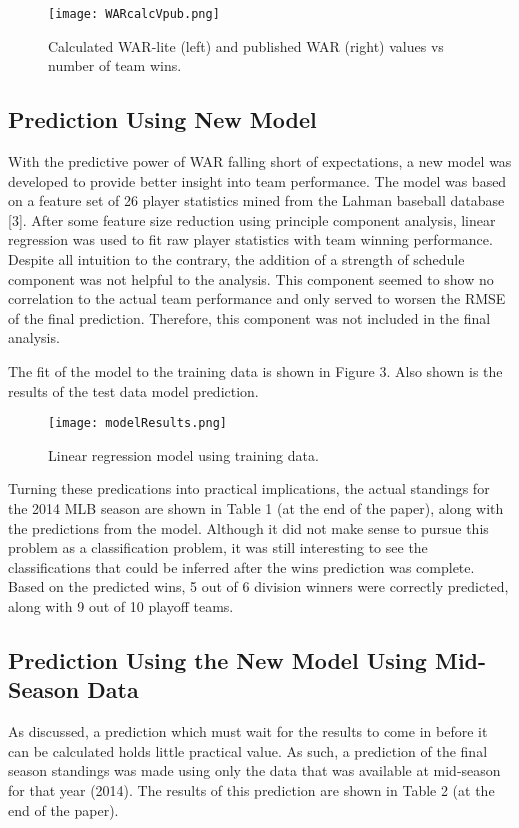 \documentclass{article} %
\begin{document}
\begin{figure}[ht!]
\centering
\texttt{[image: WARcalcVpub.png]}
\caption{Calculated WAR-lite (left) and published WAR (right) values vs number of team wins.\label{overflow}}
\end{figure}

\subsection{Prediction Using New Model}
With the predictive power of WAR falling short of expectations, a new model was developed to provide better insight into team performance.  The model was based on a feature set of 26 player statistics mined from the Lahman baseball database [3].  After some feature size reduction using principle component analysis, linear regression was used to fit raw player statistics with team winning performance.  Despite all intuition to the contrary, the addition of a strength of schedule component was not helpful to the analysis.  This component seemed to show no correlation to the actual team performance and only served to worsen the RMSE of the final prediction.  Therefore, this component was not included in the final analysis.

The fit of the model to the training data is shown in Figure 3.  Also shown is the results of the test data model prediction.

\begin{figure}[ht!]
\centering
\texttt{[image: modelResults.png]}
\caption{Linear regression model using training data.\label{overflow}}
\end{figure}

Turning these predications into practical implications, the actual standings for the 2014 MLB season are shown in Table 1 (at the end of the paper), along with the predictions from the model. Although it did not make sense to pursue this problem as a classification problem, it was still interesting to see the classifications that could be inferred after the wins prediction was complete.  Based on the predicted wins, 5 out of 6 division winners were correctly predicted, along with 9 out of 10 playoff teams.   



\subsection{Prediction Using the New Model Using Mid-Season Data}
As discussed, a prediction which must wait for the results to come in before it can be calculated holds little practical value.  As such, a prediction of the final season standings was made using only the data that was available at mid-season for that year (2014).  The results of this prediction are shown in Table 2 (at the end of the paper).
\end{document}
